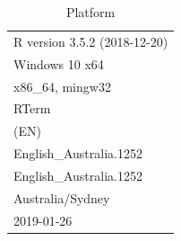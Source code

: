 \documentclass{grattan}\usepackage[]{graphicx}\usepackage[]{color}
\begin{document}
\begin{table}[!htb]
\centering
\caption{Platform}
\begin{tabularx}{\linewidth}{l}
  \toprule
 R version 3.5.2 (2018-12-20) \\ 
  Windows 10 x64 \\ 
  x86\_64, mingw32 \\ 
  RTerm \\ 
  (EN) \\ 
  English\_Australia.1252 \\ 
  English\_Australia.1252 \\ 
  Australia/Sydney \\ 
  2019-01-26 \\ 
   \bottomrule
\end{tabularx}

\end{table}

\end{document}
